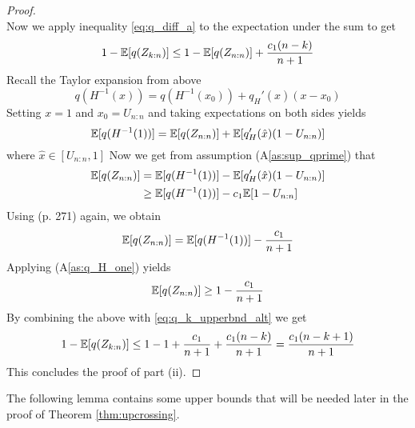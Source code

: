 \begin{lemma}
\begin{proof}
\begin{equation*}
		\end{equation*}	
		Now we apply inequality \eqref{eq:q_diff_a} to the expectation under the sum to get 
		\begin{equation}
			1 - \mathbb{E}[q(Z_{k:n})] \leq 1 - \mathbb{E}[q(Z_{n:n})] + \frac{c_1(n-k)}{n+1}
			\label{eq:q_k_upperbnd_alt}
		\end{equation}
		Recall the Taylor expansion from above
		\begin{equation*}
			q(H^{-1}(x)) = q(H^{-1}(x_0)) + q_H'(\hat{x})(x-x_0)
		\end{equation*}	
		Setting $x = 1$ and $x_0 = U_{n:n}$ and taking expectations on both sides yields
		\begin{equation*}
			\mathbb{E}[q(H^{-1}(1))] = \mathbb{E}[q(Z_{n:n})] + \mathbb{E}[q_H'(\hat{x})(1 - U_{n:n})]
		\end{equation*}
		where $\hat{x} \in [U_{n:n}, 1]$ 
		Now we get from assumption (A\ref{as:sup_qprime}) that
		\begin{align*}
			\mathbb{E}[q(Z_{n:n})] &= \mathbb{E}[q(H^{-1}(1))] - \mathbb{E}[q_H'(\hat{x})(1 - U_{n:n})]\\
			&\geq \mathbb{E}[q(H^{-1}(1))] - c_1\mathbb{E}[1 - U_{n:n}]\\
		\end{align*}
		Using \cite{shorack2009empirical} (p. 271) again, we obtain
		\begin{align*}
			\mathbb{E}[q(Z_{n:n})]
			&= \mathbb{E}[q(H^{-1}(1))] - \frac{c_1}{n+1}\\
		\end{align*}
		Applying (A\ref{as:q_H_one}) yields
		\begin{equation*}
			\mathbb{E}[q(Z_{n:n})]  \geq 1 - \frac{c_1}{n+1}
		\end{equation*}
		By combining the above with \eqref{eq:q_k_upperbnd_alt} we get
		\begin{equation*}
			1 - \mathbb{E}[q(Z_{k:n})] \leq 1 - 1 + \frac{c_1}{n+1} + \frac{c_1(n-k)}{n+1} = \frac{c_1(n-k+1)}{n+1} 
		\end{equation*}	
		This concludes the proof of part (ii). 
	\end{proof}
\end{lemma}
%
\noindent The following lemma contains some upper bounds that will be needed later in the proof of Theorem \ref{thm:upcrossing}.
